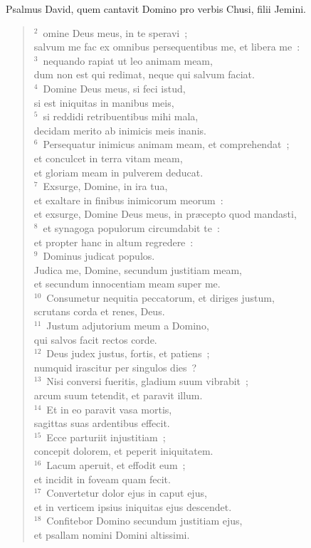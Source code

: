 \bchapter[Psalm]
Psalmus David, quem cantavit Domino pro verbis Chusi, filii Jemini.
\begin{verse}${}^{2}$~omine Deus meus, in te speravi~;\\ salvum me fac ex omnibus persequentibus me, et libera me~:\\
${}^{3}$~nequando rapiat ut leo animam meam,\\ dum non est qui redimat, neque qui salvum faciat.\\
${}^{4}$~Domine Deus meus, si feci istud,\\ si est iniquitas in manibus meis,\\
${}^{5}$~si reddidi retribuentibus mihi mala,\\ decidam merito ab inimicis meis inanis.\\
${}^{6}$~Persequatur inimicus animam meam, et comprehendat~;\\ et conculcet in terra vitam meam,\\ et gloriam meam in pulverem deducat.\\
${}^{7}$~Exsurge, Domine, in ira tua,\\ et exaltare in finibus inimicorum meorum~:\\ et exsurge, Domine Deus meus, in pr\ae cepto quod mandasti,\\
${}^{8}$~et synagoga populorum circumdabit te~:\\ et propter hanc in altum regredere~:\\
${}^{9}$~Dominus judicat populos.\\ Judica me, Domine, secundum justitiam meam,\\ et secundum innocentiam meam super me.\\
${}^{10}$~Consumetur nequitia peccatorum, et diriges justum,\\ scrutans corda et renes, Deus.\\
${}^{11}$~Justum adjutorium meum a Domino,\\ qui salvos facit rectos corde.\\
${}^{12}$~Deus judex justus, fortis, et patiens~;\\ numquid irascitur per singulos dies~?\\
${}^{13}$~Nisi conversi fueritis, gladium suum vibrabit~;\\ arcum suum tetendit, et paravit illum.\\
${}^{14}$~Et in eo paravit vasa mortis,\\ sagittas suas ardentibus effecit.\\
${}^{15}$~Ecce parturiit injustitiam~;\\ concepit dolorem, et peperit iniquitatem.\\
${}^{16}$~Lacum aperuit, et effodit eum~;\\ et incidit in foveam quam fecit.\\
${}^{17}$~Convertetur dolor ejus in caput ejus,\\ et in verticem ipsius iniquitas ejus descendet.\\
${}^{18}$~Confitebor Domino secundum justitiam ejus,\\ et psallam nomini Domini altissimi.\end{verse}




